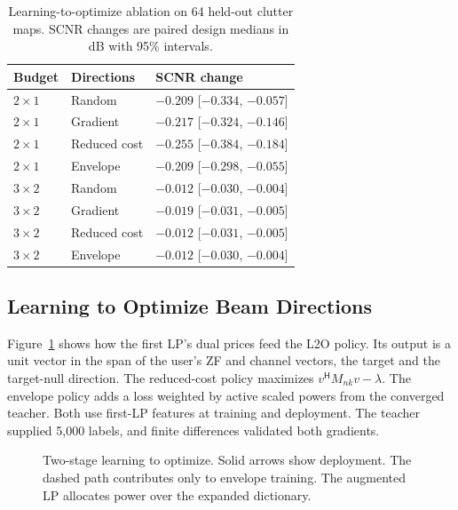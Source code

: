 \documentclass[journal]{IEEEtran}
\newcommand{\HH}{^{\mathsf H}}
\begin{document}
\begin{table}[t]
 \caption{Learning-to-optimize ablation on 64 held-out clutter maps. SCNR changes are paired design medians in dB with 95\% intervals.}
 \label{tab:learning}
 \centering\footnotesize
 \setlength{\tabcolsep}{2.5pt}
 \begin{tabular}{@{}lll@{}}
 \toprule
 Budget & Directions & SCNR change\\
 \midrule
 $2\times1$ & Random & $-0.209$ [$-0.334$, $-0.057$] \\
$2\times1$ & Gradient & $-0.217$ [$-0.324$, $-0.146$] \\
$2\times1$ & Reduced cost & $-0.255$ [$-0.384$, $-0.184$] \\
$2\times1$ & Envelope & $-0.209$ [$-0.298$, $-0.055$] \\
$3\times2$ & Random & $-0.012$ [$-0.030$, $-0.004$] \\
$3\times2$ & Gradient & $-0.019$ [$-0.031$, $-0.005$] \\
$3\times2$ & Reduced cost & $-0.012$ [$-0.031$, $-0.005$] \\
$3\times2$ & Envelope & $-0.012$ [$-0.030$, $-0.004$] \\
 \bottomrule
 \end{tabular}
\end{table}

\subsection{Learning to Optimize Beam Directions}
Figure~\ref{fig:l2o-architecture} shows how the first LP's dual prices feed the L2O policy. Its output is a unit vector in the span of the user's ZF and channel vectors, the target and the target-null direction. The reduced-cost policy maximizes \(v\HH M_{nk}v-\lambda\). The envelope policy adds a loss weighted by active scaled powers from the converged teacher. Both use first-LP features at training and deployment. The teacher supplied 5,000 labels, and finite differences validated both gradients.

\begin{figure}[t]
 \centering
 
 \caption{Two-stage learning to optimize. Solid arrows show deployment. The dashed path contributes only to envelope training. The augmented LP allocates power over the expanded dictionary.}
 \label{fig:l2o-architecture}
\end{figure}
\end{document}
